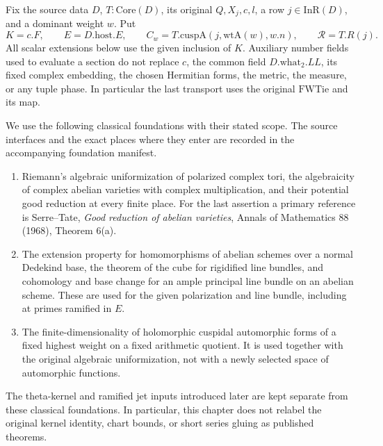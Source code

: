 \documentclass[11pt,a4paper]{article}
\numberwithin{equation}{section}
\theoremstyle{remark}\newtheorem{remark}[theorem]{Remark}
\begin{document}
Fix the source data \(D\), \(T:\mathrm{Core}(D)\), its original
\(Q,X_j,c,l\), a row \(j\in\mathrm{InR}(D)\), and a dominant weight
\(w\).  Put
\[
 K=c.F,\qquad E=D.\mathrm{host}.E,\qquad
 C_w=T.\mathrm{cuspA}(j,\mathrm{wtA}(w),w.n),\qquad
 \mathcal R=T.R(j).
\]
All scalar extensions below use the given inclusion of \(K\).  Auxiliary
number fields used to evaluate a section do not replace \(c\), the common
field \(D.\mathrm{what}_2.LL\), its fixed complex embedding, the chosen
Hermitian forms, the metric, the measure, or any tuple phase.  In particular
the last transport uses the original \(\mathrm{FWTie}\) and its map.

We use the following classical foundations with their stated scope.
The source interfaces and the exact places where they enter are recorded
in the accompanying foundation manifest.

\begin{enumerate}
\item Riemann's algebraic uniformization of polarized complex tori, the
algebraicity of complex abelian varieties with complex multiplication,
and their potential good reduction at every finite place.  For the last
assertion a primary reference is Serre--Tate, \emph{Good reduction of
abelian varieties}, Annals of Mathematics 88 (1968), Theorem 6(a).
\item The extension property for homomorphisms of abelian schemes over
a normal Dedekind base, the theorem of the cube for rigidified line
bundles, and cohomology and base change for an ample principal line
bundle on an abelian scheme.  These are used for the given polarization
and line bundle, including at primes ramified in \(E\).
\item The finite-dimensionality of holomorphic cuspidal automorphic
forms of a fixed highest weight on a fixed arithmetic quotient.  It is
used together with the original algebraic uniformization, not with a
newly selected space of automorphic functions.
\end{enumerate}

The theta-kernel and ramified jet inputs introduced later are kept
separate from these classical foundations.  In particular, this chapter
does not relabel the original kernel identity, chart bounds, or short
series gluing as published theorems.

\end{document}
